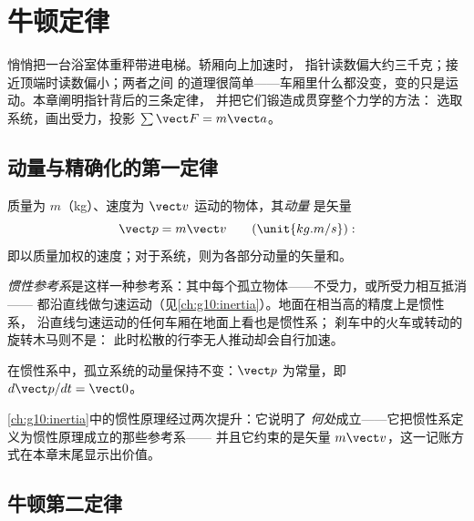 \chapter{牛顿定律}\label{ch:g12:newtons-laws}

悄悄把一台浴室体重秤带进电梯。轿厢向上加速时，
指针读数偏大约三千克；接近顶端时读数偏小；两者之间
的道理很简单——车厢里什么都没变，变的只是运动。本章阐明指针背后的三条定律，
并把它们锻造成贯穿整个力学的方法：
选取系统，画出受力，投影 $\sum \vect F = m\vect a$。

\section{动量与精确化的第一定律}

\begin{definition}[动量]\label{def:g12:newtons-laws:momentum}
质量为 $m$（\unit{kg}）、速度为 $\vect v$ 运动的物体，其\emph{动量}
是矢量
\[
\vect p = m \vect v \qquad (\unit{kg.m/s}):
\]
即以质量加权的速度；对于系统，则为各部分动量的矢量和。
\end{definition}

\begin{definition}[惯性参考系]\label{def:g12:newtons-laws:inertial}
\emph{惯性参考系}是这样一种参考系：其中每个孤立物体——不受力，或所受力相互抵消——
都沿直线做匀速运动（见\cref{ch:g10:inertia}）。地面在相当高的精度上是惯性系，
沿直线匀速运动的任何车厢在地面上看也是惯性系；
刹车中的火车或转动的旋转木马则不是：
此时松散的行李无人推动却会自行加速。
\end{definition}

\begin{theorem}[牛顿第一定律]\label{thm:g12:newtons-laws:first}
在惯性系中，孤立系统的动量保持不变：$\vect p$
为常量，即 $d\vect p/dt = \vect 0$。
\end{theorem}
\admitted

\begin{remark}[惯性原理的两次精确化]\label{rem:g12:newtons-laws:sharpened}
\cref{ch:g10:inertia}中的惯性原理经过两次提升：它说明了
\emph{何处}成立——它把惯性系定义为惯性原理成立的那些参考系——
并且它约束的是矢量 $m\vect v$，这一记账方式在本章末尾显示出价值。
\end{remark}

\section{牛顿第二定律}

